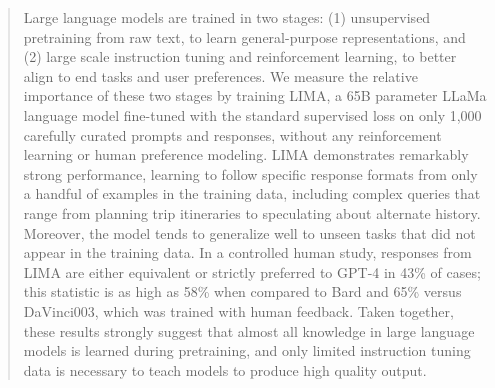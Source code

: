 \begin{abstract}
Large language models are trained in two stages: (1) unsupervised pretraining from raw text, to learn general-purpose representations, and (2) large scale instruction tuning and reinforcement learning, to better align to end tasks and user preferences. 
We measure the relative importance of these two stages by training LIMA, a 65B parameter LLaMa language model fine-tuned with the standard supervised loss on only 1,000 carefully curated prompts and responses, without any reinforcement learning or human preference modeling.
LIMA demonstrates remarkably strong performance, learning to follow specific response formats from only a handful of examples in the training data, including complex queries that range from planning trip itineraries to speculating about alternate history.
Moreover, the model tends to generalize well to unseen tasks that did not appear in the training data.
In a controlled human study, responses from LIMA are either equivalent or strictly preferred to GPT-4 in 43\% of cases; this statistic is as high as 58\% when compared to Bard and 65\% versus DaVinci003, which was trained with human feedback.
Taken together, these results strongly suggest that almost all knowledge in large language models is learned during pretraining, and only limited instruction tuning data is necessary to teach models to produce high quality output.
\end{abstract}